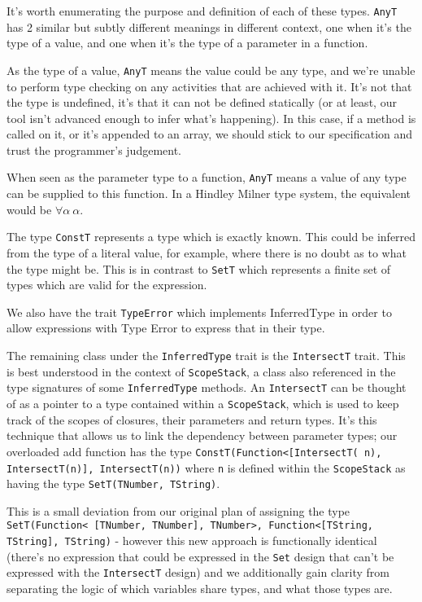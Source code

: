 \documentclass[british, twoside]{bhamthesis}
\theoremstyle{definition}
\begin{document}
      It's worth enumerating the purpose and definition of each of these types. \texttt{AnyT} has 2 similar but subtly different meanings in different context, one when it's the type of a value, and one when it's the type of a parameter in a function.

      As the type of a value, \texttt{AnyT} means the value could be any type, and we're unable to perform type checking on any activities that are achieved with it. It's not that the type is undefined, it's that it can not be defined statically (or at least, our tool isn't advanced enough to infer what's happening). In this case, if a method is called on it, or it's appended to an array, we should stick to our specification and trust the programmer's judgement.

      When seen as the parameter type to a function, \texttt{AnyT} means a value of any type can be supplied to this function. In a Hindley Milner type system, the equivalent would be $\forall\alpha~\alpha$.

      The type \texttt{ConstT} represents a type which is exactly known. This could be inferred from the type of a literal value, for example, where there is no doubt as to what the type might be. This is in contrast to \texttt{SetT} which represents a finite set of types which are valid for the expression.

      We also have the trait \texttt{TypeError} which implements InferredType in order to allow expressions with Type Error to express that in their type.

      The remaining class under the \texttt{InferredType} trait is the \texttt{IntersectT} trait. This is best understood in the context of \texttt{ScopeStack}, a class also referenced in the type signatures of some \texttt{InferredType} methods. An \texttt{IntersectT} can be thought of as a pointer to a type contained within a \texttt{ScopeStack}, which is used to keep track of the scopes of closures, their parameters and return types. It's this technique that allows us to link the dependency between parameter types; our overloaded add function has the type \texttt{ConstT(Function<[IntersectT( n), IntersectT(n)], IntersectT(n))} where \texttt{n} is defined within the \texttt{ScopeStack} as having the type \texttt{SetT(TNumber, TString)}.

      This is a small deviation from our original plan of assigning the type \texttt{SetT(Function< [TNumber, TNumber], TNumber>, Function<[TString, TString], TString)} - however this new approach is functionally identical (there's no expression that could be expressed in the \texttt{Set} design that can't be expressed with the \texttt{IntersectT} design) and we additionally gain clarity from separating the logic of which variables share types, and what those types are.
\end{document}
